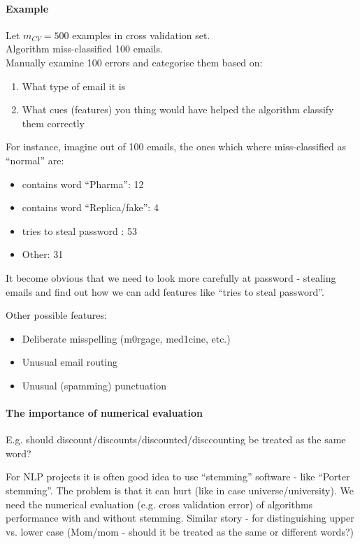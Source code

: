 \documentclass{scrartcl}
\begin{document}
\paragraph{Example}
Let $m_{CV} = 500$ examples in cross validation set. \\
Algorithm miss-classified 100 emails. \\
Manually examine 100 errors and categorise them based on:
\begin{enumerate}
\item What type of email it is
\item What cues (features) you thing would have helped the algorithm
  classify them correctly
\end{enumerate}
For instance, imagine out of 100 emails, the ones which where
miss-classified as ``normal'' are:
\begin{itemize}
\item contains word ``Pharma'': 12
\item contains word ``Replica/fake'': 4
\item tries to steal password : 53
\item Other: 31
\end{itemize}
It become obvious that we need to look more carefully at password -
stealing emails and find out how we can add features like ``tries to
steal password''.

Other possible features:
\begin{itemize}
\item Deliberate misspelling (m0rgage, med1cine, etc.)
\item Unusual email routing
\item Unusual (spamming) punctuation
\end{itemize}

\paragraph{The importance of numerical evaluation}

E.g. should discount/discounts/discounted/disccounting be treated as
the same word?

For NLP projects it is often good idea to use ``stemming'' software -
like ``Porter stemming''. The problem is that it can hurt (like in
case universe/university). We need the numerical evaluation (e.g.
cross validation error) of algorithms performance with and without
stemming. Similar story - for distinguishing upper vs. lower case
(Mom/mom - should it be treated as the same or different words?)
\end{document}
